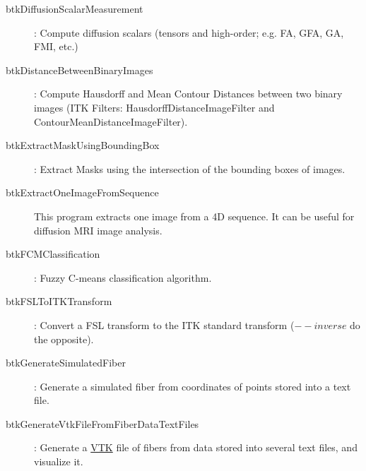 \begin{description}
\item[btkDiffusionScalarMeasurement]: Compute diffusion scalars (tensors and high-order; e.g. FA, GFA, GA, FMI, etc.)
\item[btkDistanceBetweenBinaryImages]: Compute Hausdorff and Mean Contour Distances between two binary images (ITK Filters: HausdorffDistanceImageFilter and ContourMeanDistanceImageFilter).
\item[btkExtractMaskUsingBoundingBox]: Extract Masks using the intersection of the bounding boxes of images.
\item[btkExtractOneImageFromSequence] This program extracts one image from a 4D sequence. It can be useful for diffusion MRI image analysis. 
\item[btkFCMClassification]: Fuzzy C-means classification algorithm.
\item[btkFSLToITKTransform]: Convert a FSL transform to the ITK standard transform ($--inverse$ do the opposite).
\item[btkGenerateSimulatedFiber]: Generate a simulated fiber from coordinates of points stored into a text file. 
\item[btkGenerateVtkFileFromFiberDataTextFiles]: Generate a \href{www.vtk.org/VTK/img/file-formats.pdf}{VTK} file of fibers from data stored into several text files, and visualize it.

\end{description}

